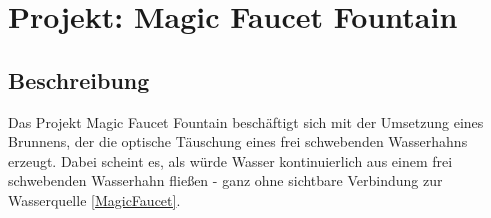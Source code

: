 %
%
%


\chapter{Projekt: Magic Faucet Fountain}\label{beschreibung}


\section{Beschreibung}
Das Projekt Magic Faucet Fountain beschäftigt sich mit der Umsetzung eines Brunnens, der die optische Täuschung eines frei schwebenden Wasserhahns erzeugt. Dabei scheint es, als würde Wasser kontinuierlich aus einem frei schwebenden Wasserhahn fließen - ganz ohne sichtbare Verbindung zur Wasserquelle \ref{MagicFaucet}.
